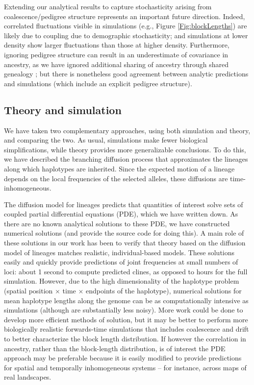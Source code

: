 \documentclass[11pt,letterpaper]{article}
\begin{document}
Extending our analytical results to capture stochasticity arising from coalescence/pedigree structure represents an important future direction.  
Indeed, correlated fluctuations visible in simulations (e.g., Figure \ref{Fig:blockLengths})
are likely due to coupling due to demographic stochasticity;
and simulations at lower density show larger fluctuations than those at higher density.
Furthermore, ignoring pedigree structure can result in an underestimate of covariance in ancestry, as we have ignored additional sharing of ancestry through shared genealogy \citep{liang2014lengths};
but there is nonetheless good agreement between analytic predictions and simulations (which include an explicit pedigree structure).



\subsection*{Theory and simulation}
We have taken two complementary approaches,
using both simulation and theory, and comparing the two.
As usual, simulations make fewer biological simplifications,
while theory provides more generalizable conclusions.
To do this, we have described the branching diffusion process that approximates
the lineages along which haplotypes are inherited.
Since the expected motion of a lineage depends on the local frequencies of the selected alleles,
these diffusions are time-inhomogeneous.

The diffusion model for lineages predicts that quantities of interest solve sets of coupled partial differential equations (PDE),
which we have written down.
As there are no known analytical solutions to these PDE,
we have constructed numerical solutions (and provide the source code for doing this).
A main role of these solutions in our work has been to verify that theory based on the diffusion model of lineages
matches realistic, individual-based models.  
These solutions easily and quickly provide predictions of joint frequencies at small numbers of loci:
about 1 second to compute predicted clines, as opposed to hours for the full simulation.
However, due to the high dimensionality of the haplotype problem (spatial position $\times$ time $\times$ endpoints of the haplotype),
numerical solutions for mean haplotype lengths along the genome can be as computationally intensive as simulations
(although are substantially less noisy).
More work could be done to develop more efficient methods of solution, 
but it may be better to perform more biologically realistic forwards-time simulations that includes coalescence and drift to better characterize the block length distribution.
If however the correlation in ancestry, rather than the block-length distribution, is of interest the PDE approach may be preferable because it is easily modified to provide predictions for spatial and temporally inhomogeneous systems -- for instance, across maps of real landscapes.
\end{document}
